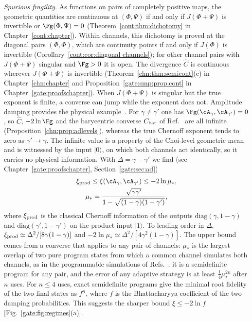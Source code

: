 \emph{Spurious fragility.} As functions on pairs of completely positive maps, the geometric quantities are continuous at $(\Phi,\Psi)$ if and only if $J(\Phi+\Psi)$ is invertible or $\Fg(\Phi,\Psi)=0$ (Theorem~\ref{cont:thm:dichotomy} in Chapter~\ref{cont:chapter}). Within channels, this dichotomy is proved at the diagonal pairs $(\Phi,\Phi)$, which are continuity points if and only if $J(\Phi)$ is invertible (Corollary~\ref{cont:cor:diagonal channels}); for other channel pairs with $J(\Phi+\Psi)$ singular and $\Fg>0$ it is open. The divergence $\hat C$ is continuous wherever $J(\Phi+\Psi)$ is invertible (Theorem~\ref{chn:thm:semicont}(c) in Chapter~\ref{chn:chapter} and Proposition~\ref{gate:smp:prop:cont} in Chapter~\ref{gate:proofschapter}). When $J(\Phi+\Psi)$ is singular but the true exponent is finite, a converse can jump while the exponent does not. Amplitude damping provides the physical example~\cite{RexitiMancini2021}. For $\gamma\neq\gamma'$ one has $\Fg(\cA_\gamma,\cA_{\gamma'})=0$, so $\hat C$, $-2\ln\Fg$ and the barycentric converse $C_{\rm bar}$ of Ref.~\cite{JMMW2024} are all infinite (Proposition~\ref{chn:prop:adlevels}), whereas the true Chernoff exponent tends to zero as $\gamma'\to\gamma$. The infinite value is a property of the Choi-level geometric mean and is witnessed by the input $|0\rangle$, on which both channels act identically, so it carries no physical information. With $\Delta=\gamma-\gamma'$ we find (see Chapter~\ref{gate:proofschapter}, Section~\ref{gate:sec:ad})
\begin{gather}
\xi_{\rm prod}\le\xi(\cA_\gamma,\cA_{\gamma'})\le-2\ln\mu_*,\label{gate:eq:ad}\\
\mu_*=\frac{\sqrt{\gamma\gamma'}}{1-\sqrt{(1-\gamma)(1-\gamma')}},\nonumber
\end{gather}
where $\xi_{\rm prod}$ is the classical Chernoff information of the outputs $\mathrm{diag}(\gamma,1-\gamma)$ and $\mathrm{diag}(\gamma',1-\gamma')$ on the product input $|1\rangle$. To leading order in $\Delta$, $\xi_{\rm prod}\simeq\Delta^2/[8\gamma(1-\gamma)]$ and $-2\ln\mu_*\simeq\Delta^2/[4\gamma^2(1-\gamma)]$. The upper bound comes from a converse that applies to any pair of channels: $\mu_*$ is the largest overlap of two pure program states from which a common channel simulates both channels, as in the programmable simulations of Refs.~\cite{PirandolaLupo2017,Pirandola2019}; it is a semidefinite program for any pair, and the error of any adaptive strategy is at least $\frac14\mu_*^{2n}$ after $n$ uses. For $n\le4$ uses, exact semidefinite programs give the minimal root fidelity of the two final states as $f^n$, where $f$ is the Bhattacharyya coefficient of the two damping probabilities. This suggests the sharper bound $\xi\le-2\ln f$ [Fig.~\ref{gate:fig:regimes}(a)].

